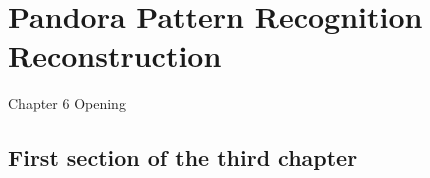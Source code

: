 \chapter{Pandora Pattern Recognition Reconstruction}

\ifpdf
    \graphicspath{{Chapter6/Figs/Raster/}{Chapter6/Figs/PDF/}{Chapter6/Figs/}}
\else
    \graphicspath{{Chapter6/Figs/Vector/}{Chapter6/Figs/}}
\fi


Chapter 6 Opening


\section{First section of the third chapter}
